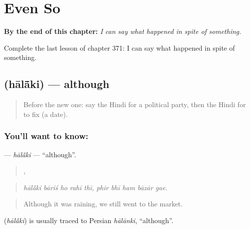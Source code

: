 
\chapter{Even So}
\label{ch:hi-even-so}

\begin{chapteropening}
\textbf{By the end of this chapter:} \emph{I can say what happened in spite of something.}

Complete the last lesson of chapter 371: I can say what happened in spite of something.
\end{chapteropening}

\section[\texorpdfstring{\hi{हालाँकि} (hālā̃ki)}{हालाँकि (hālā̃ki)}]{ (hālā̃ki) — although}

\label{lesson:HI-C371-halaki}



\begin{quote}
Before the new one: say the Hindi for a political party, then the Hindi for to fix (a date).
\end{quote}

\subsection*{You'll want to know: }
\textbf{} — \emph{hālā̃ki} — \textquotedblleft{}although\textquotedblright{}.

\begin{quote}
    ,     
\end{quote}

\begin{quote}
\emph{hālā̃ki bāriś ho rahī thī, phir bhī ham bāzār gae.}
\end{quote}

\begin{quote}
Although it was raining, we still went to the market.
\end{quote}

\begin{cousinweb}
\textbf{} (\emph{hālā̃ki}) is usually traced to Persian \emph{hālānki}, \textquotedblleft{}although\textquotedblright{}.
\end{cousinweb}

